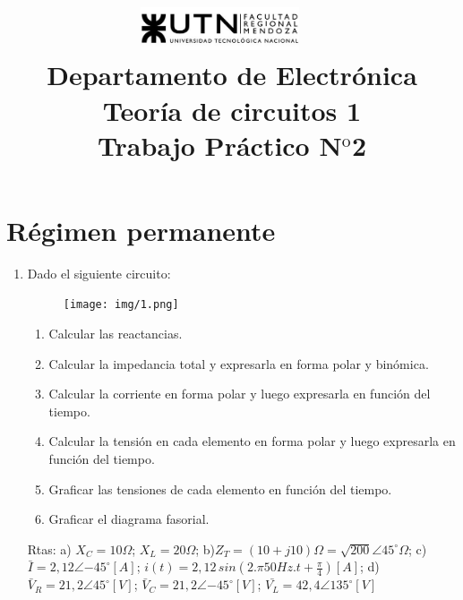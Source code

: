 \documentclass[10pt,a4paper]{article}
\title{
	\textsc{\includegraphics[width=0.35\textwidth]{logoUTN.jpg}} ~\\
	{\large Departamento de Electr\'onica}\\ 
	[0.1cm]
	{\Huge{Teoría de circuitos 1}} \\
	[0.25cm]
	{\Large{Trabajo Práctico N$^{\text {o}}$2}		\\
}}
\author{}
\date{}
\begin{document}
	\maketitle
	
\section{Régimen permanente}
\begin{enumerate}
	

\item Dado el siguiente circuito:

\begin{figure}[H]
	\centering
	\texttt{[image: img/1.png]}
	\label{e1}
\end{figure}

\begin{enumerate}

	 \item Calcular las reactancias. 

	 \item Calcular la impedancia total y expresarla en forma polar y binómica.

	 \item Calcular la corriente en forma polar y luego expresarla en función del tiempo.

	 \item Calcular la tensión en cada elemento en forma polar y luego expresarla en función del tiempo.

	 \item Graficar las tensiones de cada elemento en función del tiempo.

	 \item Graficar el diagrama fasorial.
	 
\end{enumerate}

Rtas: a) $X_C=10 \Omega$; $X_L=20 \Omega$; b)$Z_T=(10+j10)\Omega=\sqrt{200}\angle{45^{\circ}}\Omega$; c) $\bar{I}=2,12\angle{-45^{\circ}}[A]$; $i(t)=2,12\,sin(2.\pi 50Hz.t+\frac{\pi}{4})[A]$; d)$\bar{V}_R=21,2\angle{45^{\circ}}[V]$; $\bar{V}_C=21,2\angle{-45^{\circ}}[V]$; $\bar{V_L}=42,4\angle{135^{\circ}}[V]$\\




\end{enumerate}
\end{document}
